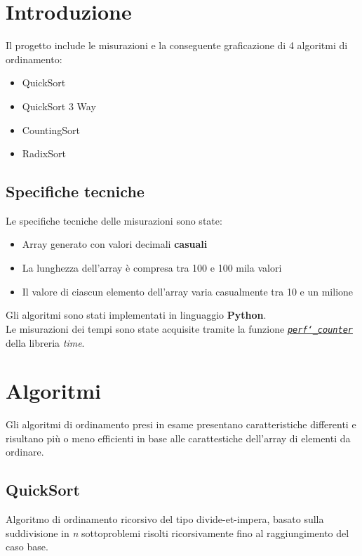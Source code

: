 \documentclass[a4paper, 11pt]{article}
\newcommand{\myfrontpage}{%
  \begin{titlepage}
  \centering
  \preparefrontpage
  \end{titlepage}
}
\begin{document}
\myfrontpage

\thispagestyle{empty} 

\newpage

\tableofcontents
\newpage
\section{Introduzione}
Il progetto include le misurazioni e la conseguente graficazione di 4 algoritmi di ordinamento:
\begin{itemize}
    \item QuickSort
    \item QuickSort 3 Way
    \item CountingSort
    \item RadixSort
\end{itemize}
\subsection{Specifiche tecniche}
Le specifiche tecniche delle misurazioni sono state:
\begin{itemize}
    \item Array generato con valori decimali \textbf{casuali}
    \item La lunghezza dell'array è compresa tra 100 e 100 mila valori
    \item Il valore di ciascun elemento dell'array varia casualmente tra 10 e un milione
\end{itemize}
Gli algoritmi sono stati implementati in linguaggio \textbf{Python}. \\
Le misurazioni dei tempi sono state acquisite tramite la funzione \href{https://docs.python.org/3/library/time.html#time.perf_counter}{\textit{\texttt{perf\char`_counter}}} della libreria \textit{time}.

\section{Algoritmi}
Gli algoritmi di ordinamento presi in esame presentano caratteristiche differenti e risultano più o meno efficienti in base alle carattestiche dell'array di elementi da ordinare.

\subsection{QuickSort}
Algoritmo di ordinamento ricorsivo del tipo divide-et-impera, basato sulla suddivisione in \textit{n} sottoproblemi risolti ricorsivamente fino al raggiungimento del caso base.
\end{document}

